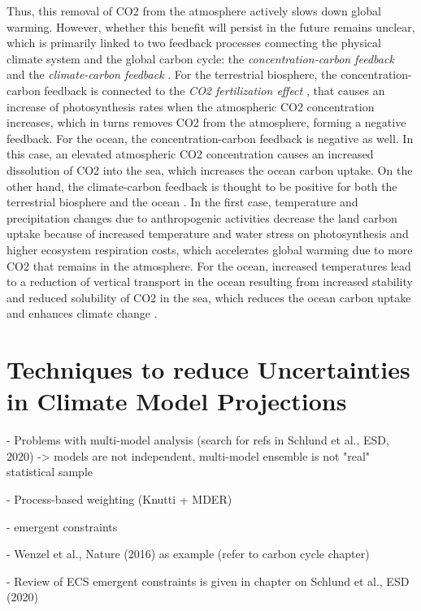 Thus, this removal of \ac{CO2} from the atmosphere actively slows down global
warming. However, whether this benefit will persist in the future remains
unclear, which is primarily linked to two feedback processes connecting the
physical climate system and the global carbon cycle: the
\emph{concentration-carbon feedback} and the \emph{climate-carbon feedback}
\autocite{Friedlingstein2006, Gregory2009, Collins2013}. For the terrestrial
biosphere, the concentration-carbon feedback is connected to the \emph{\ac{CO2}
  fertilization effect} \autocite{Walker2020}, that causes an increase of
photosynthesis rates when the atmospheric \ac{CO2} concentration increases,
which in turns removes \ac{CO2} from the atmosphere, forming a negative
feedback. For the ocean, the concentration-carbon feedback is negative as well.
In this case, an elevated atmospheric \ac{CO2} concentration causes an
increased dissolution of \ac{CO2} into the sea, which increases the ocean
carbon uptake. On the other hand, the climate-carbon feedback is thought to be
positive for both the terrestrial biosphere and the ocean
\autocite{Gregory2009}. In the first case, temperature and precipitation
changes due to anthropogenic activities decrease the land carbon uptake because
of increased temperature and water stress on photosynthesis and higher
ecosystem respiration costs, which accelerates global warming due to more
\ac{CO2} that remains in the atmosphere. For the ocean, increased temperatures
lead to a reduction of vertical transport in the ocean resulting from increased
stability and reduced solubility of \ac{CO2} in the sea, which reduces the
ocean carbon uptake and enhances climate change \autocite{Gregory2009}.


\section{Techniques to reduce Uncertainties in Climate Model Projections}
\label{sec:02:techniques}

- Problems with multi-model analysis (search for refs in Schlund et al., ESD,
2020) -> models are not independent, multi-model ensemble is not "real"
statistical sample

- Process-based weighting (Knutti + MDER)

- emergent constraints

- Wenzel et al., Nature (2016) as example (refer to carbon cycle chapter)

- Review of ECS emergent constraints is given in chapter on Schlund et al., ESD
(2020)